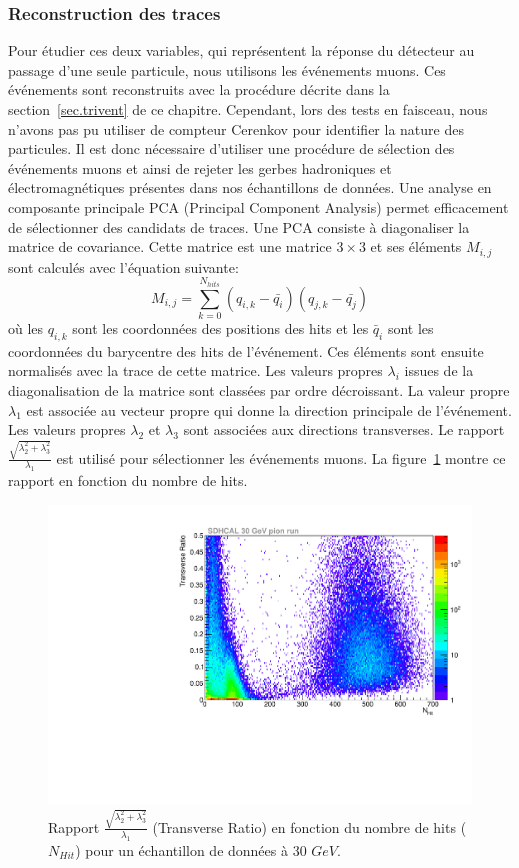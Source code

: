 \subsubsection{Reconstruction des traces}
Pour étudier ces deux variables, qui représentent la réponse du détecteur au passage d'une seule particule, nous utilisons les événements muons. Ces événements sont reconstruits avec la procédure décrite dans la section~\ref{sec.trivent} de ce chapitre. Cependant, lors des tests en faisceau, nous n'avons pas pu utiliser de compteur Cerenkov pour identifier la nature des particules. Il est donc nécessaire d'utiliser une procédure de sélection des événements muons et ainsi de rejeter les gerbes hadroniques et électromagnétiques présentes dans nos échantillons de données. Une analyse en composante principale PCA (Principal Component Analysis) permet efficacement de sélectionner des candidats de traces. Une PCA consiste à diagonaliser la matrice de covariance. Cette matrice est une matrice $3\times3$ et ses éléments $M_{i,j}$ sont calculés avec l'équation suivante:
\begin{equation}
  M_{i,j}=\sum_{k=0}^{N_{hits}}{(q_{i,k}-\bar{q_i})(q_{j,k}-\bar{q_j})}
\end{equation}
où les $q_{i,k}$ sont les coordonnées des positions des hits et les $\bar q_i$ sont les coordonnées du barycentre des hits de l'événement. Ces éléments sont ensuite normalisés avec la trace de cette matrice. Les valeurs propres $\lambda_i$ issues de la diagonalisation de la matrice sont classées par ordre décroissant. La valeur propre $\lambda_1$ est associée au vecteur propre qui donne la direction principale de l'événement. Les valeurs propres $\lambda_2$ et $\lambda_3$ sont associées aux directions transverses. Le rapport $\frac{\sqrt{\lambda_2^2+\lambda_3^2}}{\lambda_1}$ est utilisé pour sélectionner les événements muons. La figure~\ref{fig:transverseRatio} montre ce rapport en fonction du nombre de hits. 
\begin{figure}[!ht]
  \begin{center}
    \includegraphics[width=.7\textwidth]{SDHCAL/figs/transverseRatio.pdf}
    \caption{Rapport $\frac{\sqrt{\lambda_2^2+\lambda_3^2}}{\lambda_1}$ (Transverse Ratio) en fonction du nombre de hits ($N_{Hit}$) pour un échantillon de données à 30 $GeV$.}
    \label{fig:transverseRatio}
  \end{center}
\end{figure}
